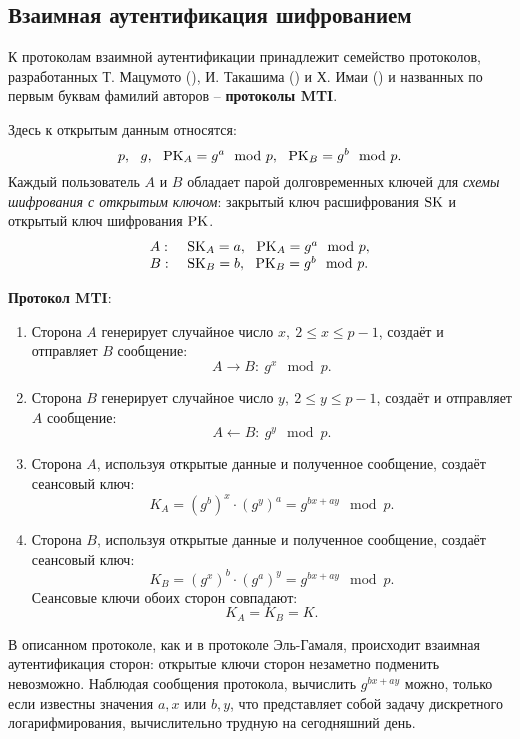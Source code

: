 \subsection{Взаимная аутентификация шифрованием}

К протоколам взаимной аутентификации принадлежит семейство протоколов, разработанных Т. Мацумото (), И. Такашима () и Х. Имаи () и названных по первым буквам фамилий авторов -- \textbf{протоколы MTI}.

Здесь к открытым данным относятся:
    \[ p, ~~ g, ~~ \textrm{PK}_A = g^a \mod p, ~~ \textrm{PK}_B = g^b \mod p. \]
Каждый пользователь $A$ и $B$ обладает парой долговременных ключей для \emph{схемы шифрования с открытым ключом}: закрытый ключ расшифрования $\textrm{SK}$ и открытый ключ шифрования $\textrm{PK}$.
\[ \begin{array}{ll}
    A: & ~ \textrm{SK}_A = a, ~~ \textrm{PK}_A = g^a \mod p, \\
    B: & ~ \textrm{SK}_B = b, ~~ \textrm{PK}_B = g^b \mod p. \\
\end{array} \]

\textbf{Протокол MTI}:
\begin{enumerate}
    \item Сторона $A$ генерирует случайное число $x, ~ 2\leq x\leq p-1$, создаёт и отправляет $B$ сообщение:
        \[ A \rightarrow B: ~ g^x \mod p. \]
    \item Сторона $B$ генерирует случайное число $y, ~ 2\leq y\leq p-1$, создаёт и отправляет $A$ сообщение:
        \[ A \leftarrow B: ~ g^y \mod p. \]
    \item Сторона $A$, используя открытые данные и полученное сообщение, создаёт сеансовый ключ:
        \[ K_A = (g^b)^x \cdot (g^y)^a = g^{bx+ay} \mod p. \]
    \item Сторона $B$, используя открытые данные и полученное сообщение, создаёт сеансовый ключ:
        \[ K_B = (g^x)^b \cdot (g^a)^y = g^{bx+ay} \mod p. \]
        Сеансовые ключи обоих сторон совпадают:
        \[ K_{A} =K_{B} = K. \]
\end{enumerate}

В описанном протоколе, как и в протоколе Эль-Гамаля, происходит взаимная аутентификация сторон: открытые ключи сторон незаметно подменить невозможно. Наблюдая сообщения протокола, вычислить $g^{bx+ay}$ можно, только если известны значения $a,x$ или $b,y$, что представляет собой задачу дискретного логарифмирования, вычислительно трудную на сегодняшний день.
